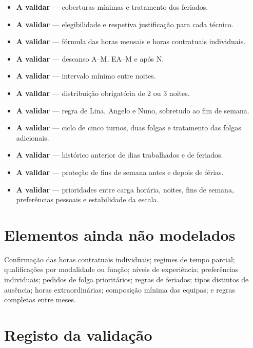 \documentclass[10pt,a4paper]{article}
\newcommand{\validar}{\textcolor{blue!70!black}{\textbf{A validar}}}
\begin{document}
\begin{itemize}
    \item \validar{} --- coberturas mínimas e tratamento dos feriados.
    \item \validar{} --- elegibilidade e respetiva justificação para cada técnico.
    \item \validar{} --- fórmula das horas mensais e horas contratuais individuais.
    \item \validar{} --- descanso A--M, EA--M e após N.
    \item \validar{} --- intervalo mínimo entre noites.
    \item \validar{} --- distribuição obrigatória de 2 ou 3 noites.
    \item \validar{} --- regra de Lina, Angelo e Nuno, sobretudo ao fim de semana.
    \item \validar{} --- ciclo de cinco turnos, duas folgas e tratamento das folgas adicionais.
    \item \validar{} --- histórico anterior de dias trabalhados e de feriados.
    \item \validar{} --- proteção de fins de semana antes e depois de férias.
    \item \validar{} --- prioridades entre carga horária, noites, fins de semana,
          preferências pessoais e estabilidade da escala.
\end{itemize}

\section*{Elementos ainda não modelados}

Confirmação das horas contratuais individuais; regimes de tempo parcial; qualificações por
modalidade ou função; níveis de experiência; preferências individuais; pedidos
de folga prioritários; regras de feriados; tipos distintos de ausência; horas
extraordinárias; composição mínima das equipas; e regras completas entre meses.

\section*{Registo da validação}
\end{document}
